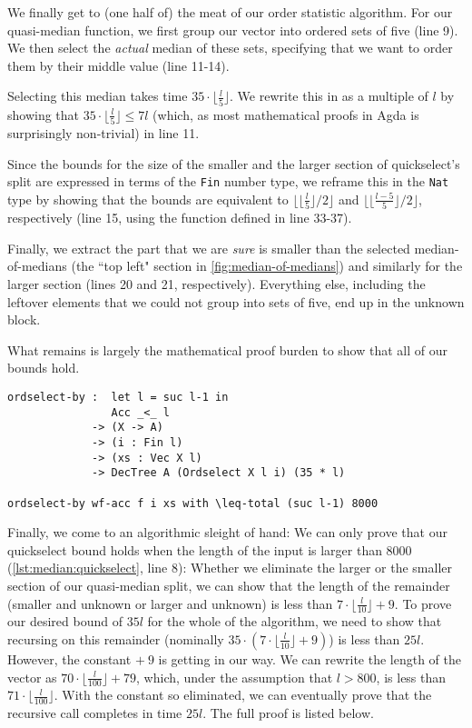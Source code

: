 We finally get to (one half of) the meat of our order statistic algorithm. For our quasi-median function, we first group our vector into ordered sets of five (line 9). We then select the \emph{actual} median of these sets, specifying that we want to order them by their middle value (line 11-14).

Selecting this median takes time $35 \cdot \lfloor \frac l 5 \rfloor$. We rewrite this in as a multiple of $l$ by showing that $35 \cdot \lfloor \frac l 5 \rfloor \leq 7 l$ (which, as most mathematical proofs in Agda is surprisingly non-trivial) in line 11.

Since the bounds for the size of the smaller and the larger section of quickselect's split are expressed in terms of the \texttt{Fin} number type, we reframe this in the \texttt{Nat} type by showing that the bounds are equivalent to $\lfloor \lfloor \frac l 5 \rfloor / 2 \rfloor$ and $\lfloor \lfloor \frac {l - 5} 5 \rfloor / 2 \rfloor$, respectively (line 15, using the function defined in line 33-37).

Finally, we extract the part that we are \emph{sure} is smaller than the selected median-of-medians (the ``top left" section in \autoref{fig:median-of-medians}) and similarly for the larger section (lines 20 and 21, respectively). Everything else, including the leftover elements that we could not group into sets of five, end up in the unknown block.

What remains is largely the mathematical proof burden to show that all of our bounds hold.

\begin{lstlisting}[caption={Quickselect (signature)},label={lst:median:quickselect},emph={ordselect,by}]
ordselect-by :  let l = suc l-1 in
                Acc _<_ l
             -> (X -> A)
             -> (i : Fin l)
             -> (xs : Vec X l)
             -> DecTree A (Ordselect X l i) (35 * l)

ordselect-by wf-acc f i xs with \leq-total (suc l-1) 8000
\end{lstlisting}

Finally, we come to an algorithmic sleight of hand: We can only prove that our quickselect bound holds when the length of the input is larger than 8000 (\autoref{lst:median:quickselect}, line 8): Whether we eliminate the larger or the smaller section of our quasi-median split, we can show that the length of the remainder (smaller and unknown or larger and unknown) is less than $7 \cdot \lfloor\frac l {10}\rfloor + 9$. To prove our desired bound of $35l$ for the whole of the algorithm, we need to show that recursing on this remainder (nominally $35\cdot(7 \cdot \lfloor\frac l {10} \rfloor + 9)$) is less than $25l$. However, the constant $+~9$ is getting in our way. We can rewrite the length of the vector as $70 \cdot \lfloor\frac l {100}\rfloor + 79$, which, under the assumption that $l > 800$, is less than $71 \cdot \lfloor\frac l {100}\rfloor$. With the constant so eliminated, we can eventually prove that the recursive call completes in time $25l$. The full proof is listed below.

